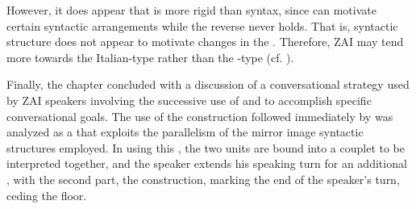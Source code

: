 However, it does appear that  is more rigid than syntax, since  can motivate certain syntactic arrangements while the reverse never holds. That is, syntactic structure does not appear to motivate changes in the . Therefore, ZAI may tend more towards the Italian-type rather than the -type (cf. ). 

Finally, the chapter concluded with a discussion of a conversational strategy used by ZAI speakers involving the successive use of  and  to accomplish specific conversational goals. The use of the  construction followed immediately by  was analyzed as a  that exploits the parallelism of the mirror image syntactic structures employed. In using this , the two  units are bound into a couplet to be interpreted together, and the speaker extends his speaking turn for an additional , with the second part, the  construction, marking the end of the speaker's turn, ceding the floor.



